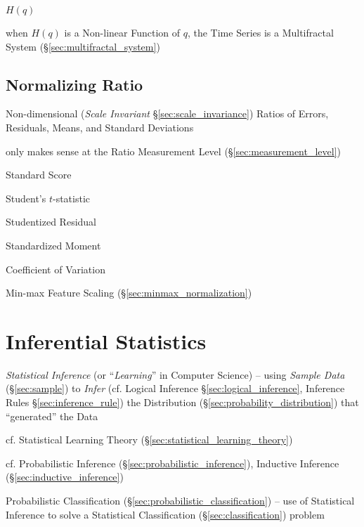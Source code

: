 $H(q)$

when $H(q)$ is a Non-linear Function of $q$, the Time Series is a Multifractal
System (\S\ref{sec:multifractal_system})



\subsection{Normalizing Ratio}\label{sec:normalizing_ratio}

Non-dimensional (\emph{Scale Invariant} \S\ref{sec:scale_invariance}) Ratios of
Errors, Residuals, Means, and Standard Deviations

only makes sense at the Ratio Measurement Level (\S\ref{sec:measurement_level})

Standard Score

Student's $t$-statistic

Studentized Residual

Standardized Moment

Coefficient of Variation

Min-max Feature Scaling (\S\ref{sec:minmax_normalization})



\section{Inferential Statistics}\label{sec:inferential_statistics}

\emph{Statistical Inference} (or ``\emph{Learning}'' in Computer Science) --
using \emph{Sample Data} (\S\ref{sec:sample}) to \emph{Infer} (cf. Logical
Inference \S\ref{sec:logical_inference}, Inference Rules
\S\ref{sec:inference_rule}) the Distribution
(\S\ref{sec:probability_distribution}) that ``generated'' the Data

\fist cf. Statistical Learning Theory (\S\ref{sec:statistical_learning_theory})

\fist cf. Probabilistic Inference
(\S\ref{sec:probabilistic_inference}), Inductive Inference
(\S\ref{sec:inductive_inference})

\fist Probabilistic Classification (\S\ref{sec:probabilistic_classification}) --
use of Statistical Inference to solve a Statistical Classification
(\S\ref{sec:classification}) problem

